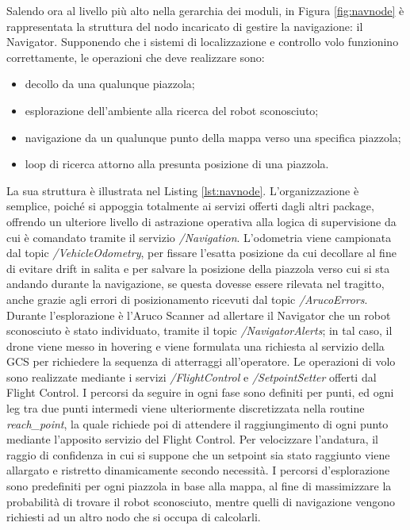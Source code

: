 \indent Salendo ora al livello più alto nella gerarchia dei moduli, in Figura \ref{fig:navnode} è rappresentata la struttura del nodo incaricato di gestire la navigazione: il Navigator. Supponendo che i sistemi di localizzazione e controllo volo funzionino correttamente, le operazioni che deve realizzare sono:
\begin{itemize}
    \item decollo da una qualunque piazzola;
    \item esplorazione dell'ambiente alla ricerca del robot sconosciuto;
    \item navigazione da un qualunque punto della mappa verso una specifica piazzola;
    \item loop di ricerca attorno alla presunta posizione di una piazzola.
\end{itemize}
La sua struttura è illustrata nel Listing \ref{lst:navnode}. L'organizzazione è semplice, poiché si appoggia totalmente ai servizi offerti dagli altri package, offrendo un ulteriore livello di astrazione operativa alla logica di supervisione da cui è comandato tramite il servizio \emph{/Navigation}. L'odometria viene campionata dal topic \emph{/VehicleOdometry}, per fissare l'esatta posizione da cui decollare al fine di evitare drift in salita e per salvare la posizione della piazzola verso cui si sta andando durante la navigazione, se questa dovesse essere rilevata nel tragitto, anche grazie agli errori di posizionamento ricevuti dal topic \emph{/ArucoErrors}. Durante l'esplorazione è l'Aruco Scanner ad allertare il Navigator che un robot sconosciuto è stato individuato, tramite il topic \emph{/NavigatorAlerts}; in tal caso, il drone viene messo in hovering e viene formulata una richiesta al servizio della GCS per richiedere la sequenza di atterraggi all'operatore. Le operazioni di volo sono realizzate mediante i servizi \emph{/FlightControl} e \emph{/SetpointSetter} offerti dal Flight Control. I percorsi da seguire in ogni fase sono definiti per punti, ed ogni leg tra due punti intermedi viene ulteriormente discretizzata nella routine \emph{reach\_point}, la quale richiede poi di attendere il raggiungimento di ogni punto mediante l'apposito servizio del Flight Control. Per velocizzare l'andatura, il raggio di confidenza in cui si suppone che un setpoint sia stato raggiunto viene allargato e ristretto dinamicamente secondo necessità. I percorsi d'esplorazione sono predefiniti per ogni piazzola in base alla mappa, al fine di massimizzare la probabilità di trovare il robot sconosciuto, mentre quelli di navigazione vengono richiesti ad un altro nodo che si occupa di calcolarli.

